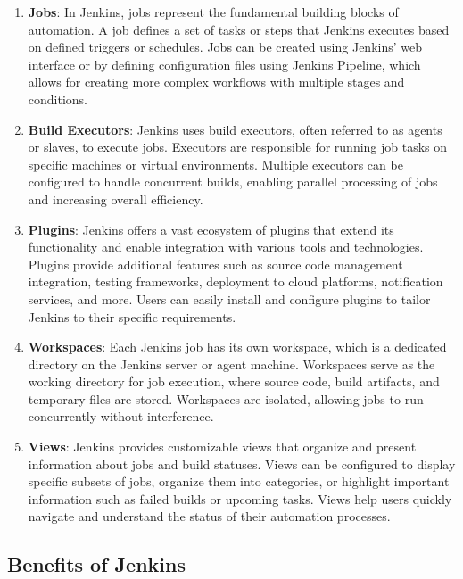 \begin{enumerate}
    \item \textbf{Jobs}: In Jenkins, jobs represent the fundamental building blocks of automation. A job defines a set of tasks or steps that Jenkins executes based on defined triggers or schedules. Jobs can be created using Jenkins' web interface or by defining configuration files using Jenkins Pipeline, which allows for creating more complex workflows with multiple stages and conditions.

    \item \textbf{Build Executors}: Jenkins uses build executors, often referred to as agents or slaves, to execute jobs. Executors are responsible for running job tasks on specific machines or virtual environments. Multiple executors can be configured to handle concurrent builds, enabling parallel processing of jobs and increasing overall efficiency.

    \item \textbf{Plugins}: Jenkins offers a vast ecosystem of plugins that extend its functionality and enable integration with various tools and technologies. Plugins provide additional features such as source code management integration, testing frameworks, deployment to cloud platforms, notification services, and more. Users can easily install and configure plugins to tailor Jenkins to their specific requirements.

    \item \textbf{Workspaces}: Each Jenkins job has its own workspace, which is a dedicated directory on the Jenkins server or agent machine. Workspaces serve as the working directory for job execution, where source code, build artifacts, and temporary files are stored. Workspaces are isolated, allowing jobs to run concurrently without interference.

    \item \textbf{Views}: Jenkins provides customizable views that organize and present information about jobs and build statuses. Views can be configured to display specific subsets of jobs, organize them into categories, or highlight important information such as failed builds or upcoming tasks. Views help users quickly navigate and understand the status of their automation processes.
\end{enumerate}

\subsection*{Benefits of Jenkins}

